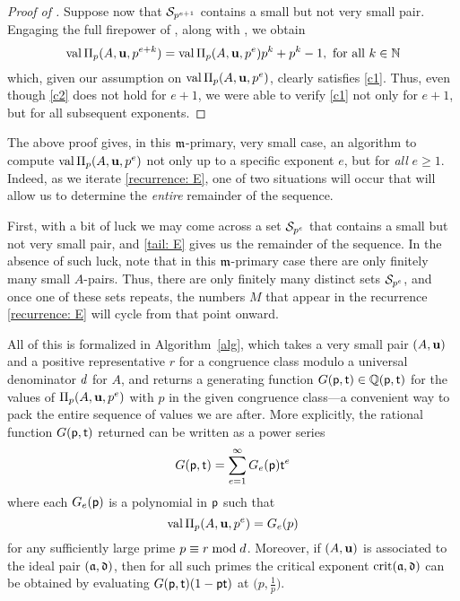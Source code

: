 \documentclass{amsart}
\begin{document}
\begin{proof}[Proof of ]
   Suppose now that $\S_{p^{e+1}}$ contains a small but not very small pair.
   Engaging the full firepower of , along with , we obtain
   \begin{equation}
      \label{tail: E}
      \val \IP_p(A,\vv{u},p^{e+k}) = \val \IP_p(A,\vv{u},p^e)p^k + p^k - 1,\text{ for all }k\in \NN
   \end{equation}
   which, given our assumption on $\val \IP_p(A,\vv{u},p^e)$, clearly satisfies \ref{c1}.
   Thus, even though \ref{c2} does not hold for $e+1$, we were able to verify \ref{c1} not only for $e+1$, but for all subsequent exponents.
\end{proof}

\begin{remark}[An algorithm]
   \label{m-primary algorithm: R}
   The above proof gives, in this $\idealm$-primary, very small case, an algorithm to compute $\val\IP_p(A,\vv{u},p^e)$ not only up to a specific exponent $e$, but for \emph{all} $e \ge 1$.
   Indeed, as we iterate \eqref{recurrence: E}, one of two situations will occur that will allow us to determine the \emph{entire} remainder of the sequence.

   First, with a bit of luck we may come across a set $\S_{p^e}$ that contains a small but not very small pair, and \eqref{tail: E} gives us the remainder of the sequence.
   In the absence of such luck, note that in this $\idealm$-primary case there are only finitely many small $A$-pairs.
   Thus, there are only finitely many distinct sets $\S_{p^e}$, and once one of these sets repeats, the numbers $M$ that appear in the recurrence \eqref{recurrence: E} will cycle from that point onward.

   All of this is formalized in Algorithm~\ref{alg}, which takes a very small pair $(A,\vv{u})$ and a positive representative $r$ for a congruence class modulo a universal denominator $\denom$ for $A$, and returns a generating function $G(\pp,\tt) \in \QQ(\pp,\tt)$ for the values of $\IP_p(A,\vv{u},p^e)$ with $p$ in the given congruence class---a convenient way to pack the entire sequence of values we are after.
   More explicitly, the rational function $G(\pp,\tt)$ returned can be written as a power series
   \[G(\pp,\tt) = \sum_{e=1}^\infty G_e(\pp)\tt^e\]
   where each $G_e(\pp)$ is a polynomial in $\pp$ such that
   \[ \val \IP_p(A,\vv{u},p^e) = G_e(p)\]
   for any sufficiently large prime $p\equiv r\bmod \denom$.
   Moreover, if $(A,\vv{u})$ is associated to the ideal pair $(\ideala,\ideald)$, then for all such primes the critical exponent $\crit(\ideala,\ideald)$ can be obtained by evaluating $G(\pp,\tt)(1-\pp\tt)$ at $\big(p,\frac1p\big)$.


\end{remark}
\end{document}
